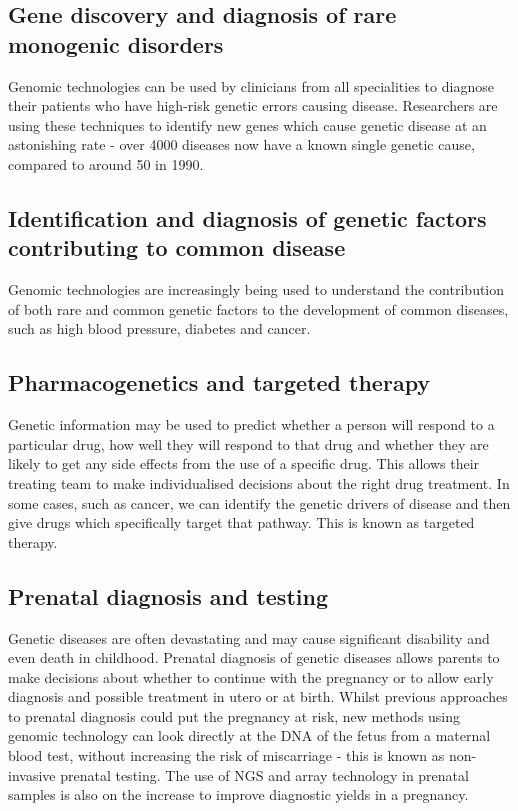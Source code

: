 \subsection{Gene discovery and diagnosis of rare monogenic disorders} 
Genomic technologies can be used by clinicians from all specialities to diagnose their patients who have high-risk genetic errors causing disease. Researchers are using these techniques to identify new genes which cause genetic disease at an astonishing rate - over 4000 diseases now have a known single genetic cause, compared to around 50 in 1990.

\subsection{Identification and diagnosis of genetic factors contributing to common disease} 
Genomic technologies are increasingly being used to understand the contribution of both rare and common genetic factors to the development of common diseases, such as high blood pressure, diabetes and cancer.

\subsection{Pharmacogenetics and targeted therapy}
Genetic information may be used to predict whether a person will respond to a particular drug, how well they will respond to that drug and whether they are likely to get any side effects from the use of a specific drug. This allows their treating team to make individualised decisions about the right drug treatment. In some cases, such as cancer, we can identify the genetic drivers of disease and then give drugs which specifically target that pathway. This is known as targeted therapy.

\subsection{Prenatal diagnosis and testing}
Genetic diseases are often devastating and may cause significant disability and even death in childhood. Prenatal diagnosis of genetic diseases allows parents to make decisions about whether to continue with the pregnancy or to allow early diagnosis and possible treatment in utero or at birth. Whilst previous approaches to prenatal diagnosis could put the pregnancy at risk, new methods using genomic technology can look directly at the DNA of the fetus from a maternal blood test, without increasing the risk of miscarriage - this is known as non-invasive prenatal testing. The use of NGS and array technology in prenatal samples is also on the increase to improve diagnostic yields in a pregnancy.

